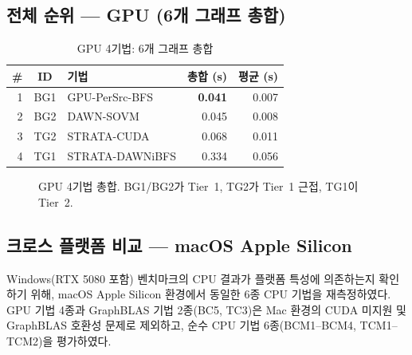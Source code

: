\documentclass[11pt,a4paper]{article}
\begin{document}
\subsection{전체 순위 --- GPU (6개 그래프 총합)}

\begin{table}[H]\centering
\caption{GPU 4기법: 6개 그래프 총합}
\label{tab:grand-gpu}
\small
\begin{tabular}{@{}rclrr@{}}
\toprule
\textbf{\#} & \textbf{ID} & \textbf{기법} & \textbf{총합 (s)} & \textbf{평균 (s)} \\
\midrule
\rowcolor{newbest!12} 1 & BG1 & GPU-PerSrc-BFS & \textbf{0.041} & 0.007 \\
\rowcolor{newbest!8} 2 & BG2 & DAWN-SOVM & 0.045 & 0.008 \\
\rowcolor{gpucol!6} 3 & TG2 & STRATA-CUDA & 0.068 & 0.011 \\
4 & TG1 & STRATA-DAWNiBFS & 0.334 & 0.056 \\
\bottomrule
\end{tabular}
\end{table}

\begin{figure}[H]
\centering
{}
\caption{GPU 4기법 총합. BG1/BG2가 Tier~1, TG2가 Tier~1 근접, TG1이 Tier~2.}
\label{fig:grand-gpu}
\end{figure}


\subsection{크로스 플랫폼 비교 --- macOS Apple Silicon}

Windows(RTX 5080 포함) 벤치마크의 CPU 결과가 플랫폼 특성에 의존하는지 확인하기 위해,
macOS Apple Silicon 환경에서 동일한 6종 CPU 기법을 재측정하였다.
GPU 기법 4종과 GraphBLAS 기법 2종(BC5, TC3)은 Mac 환경의 CUDA 미지원 및 GraphBLAS 호환성 문제로 제외하고,
순수 CPU 기법 6종(BCM1--BCM4, TCM1--TCM2)을 평가하였다.
\end{document}

